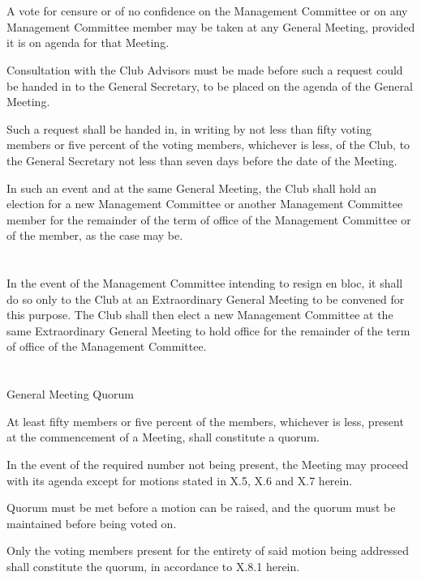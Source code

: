 \section{}
A vote for censure or of no confidence on the Management Committee or on any Management Committee member may be taken at any General Meeting, provided it is on agenda for that Meeting.
\begin{legal}
	\item Consultation with the Club Advisors must be made before such a request could be handed in to the General Secretary, to be placed on the agenda of the General Meeting.
	\item Such a request shall be handed in, in writing by not less than fifty voting members or five percent of the voting members, whichever is less, of the Club, to the General Secretary not less than seven days before the date of the Meeting.
	\item In such an event and at the same General Meeting, the Club shall hold an election for a new Management Committee or another Management Committee member for the remainder of the term of office of the Management Committee or of the member, as the case may be.
	\end{legal}

\section{}
In the event of the Management Committee intending to resign en bloc, it shall do so only to the Club at an Extraordinary General Meeting to be convened for this purpose. The Club shall then elect a new Management Committee at the same Extraordinary General Meeting to hold office for the remainder of the term of office of the Management Committee.

\section{}
General Meeting Quorum
	\begin{legal}
	\item At least fifty members or five percent of the members, whichever is less, present at the commencement of a Meeting, shall constitute a quorum.
	\item In the event of the required number not being present, the Meeting may proceed with its agenda except for motions stated in X.5, X.6 and X.7 herein.
	\item Quorum must be met before a motion can be raised, and the quorum must be maintained before being voted on.
		\begin{legal}
		\item Only the voting members present for the entirety of said motion being addressed shall constitute the quorum, in accordance to X.8.1 herein.
		\end{legal}
	\end{legal}

